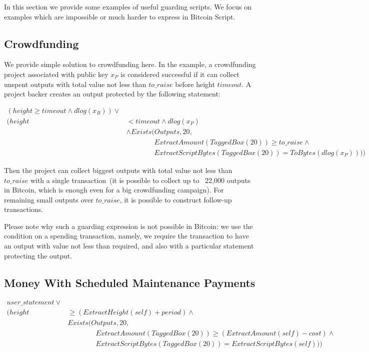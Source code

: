 \documentclass[11pt]{llncs}
\newcommand{\authnote}[2]{\marginpar{\parbox{\marginparwidth}{\tiny %
  \textsf{#1 {\textcolor{blue}{notes: #2}}}}}%
  \textcolor{blue}{\textbf{\dag}}}
\newcommand{\authnote}[2]{
  \textsf{#1 \textcolor{blue}{: #2}}}
\newcommand{\authnote}[2]{}
\newcommand{\knote}[1]{{\authnote{\textcolor{green}{kushti notes}}{#1}}}
\begin{document}
In this section we provide some examples of useful guarding scripts. We focus on examples which are impossible or much harder to express in Bitcoin Script.

\subsection{Crowdfunding}
\label{sec:crowdfunding}

We provide simple solution to crowdfunding here. In the example, a crowdfunding project associated with public key $x_P$ is considered successful if it can collect unspent outputs with total value not less than $to\_raise$ before height $timeout$. A project backer creates an output protected by the following statement: 

\begin{equation*}
\begin{split}
(height \ge timeout \land dlog(x_B)) \lor \\
(height & < timeout \land dlog(x_P)\\
& \land Exists(Outputs, 20,\\ 
& \quad \quad \quad \quad ExtractAmount(TaggedBox(20)) \ge to\_raise \land \\ 
& \quad \quad \quad \quad ExtractScriptBytes(TaggedBox(20)) = ToBytes(dlog(x_P))))
\end{split}
\end{equation*}

Then the project can collect biggest outputs with total value not less than $to\_raise$ with a single transaction~(it is possible to collect up to ~22,000 outputs in Bitcoin, which is enough even for a big crowdfunding campaign). For remaining small outputs over $to\_raise$, it is possible to construct follow-up transactions. 

Please note why such a guarding expression is not possible in Bitcoin: we use the condition on a spending transaction, namely, we require the transaction to have an output with value not less than required, and also with a particular statement protecting the output.

\subsection{Money With Scheduled Maintenance Payments}

\knote{description}

\begin{equation*}
\begin{split}
user\_statement \lor \\ 
(height & \ge (ExtractHeight(self) + period) \land \\
    & Exists(Outputs, 20, \\
    & \quad \quad \quad \quad ExtractAmount(TaggedBox(20)) \ge (ExtractAmount(self) - cost) \land \\ 
    & \quad \quad \quad \quad ExtractScriptBytes(TaggedBox(20)) = ExtractScriptBytes(self)))
\end{split}
\end{equation*}
\end{document}
